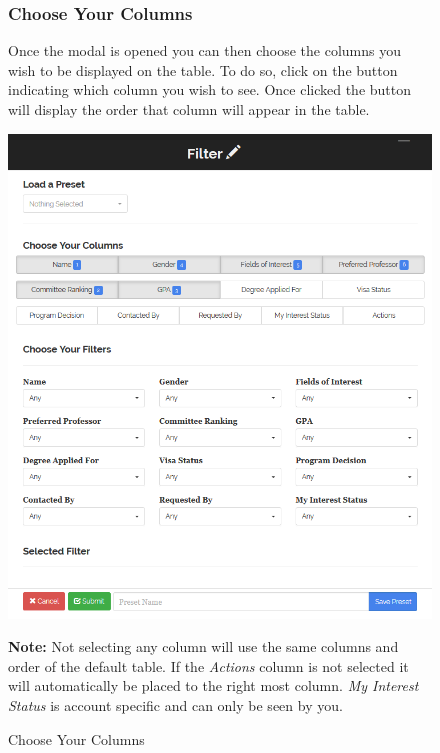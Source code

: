 \documentclass[fontsize=12pt,paper=letter,twoside]{scrartcl}
\begin{document}
\clearpage
\begin{figure}[!htb]
\subsubsection{Choose Your Columns}
Once the modal is opened you can then choose the columns you wish to be displayed on the table. To do so, click on the button indicating which column you wish to see. Once clicked the button will display the order that column will appear in the table.\begin{center}
\includegraphics[width=.99\textwidth]{images/choose_columns.png}
\end{center}
\caption{Choose Your Columns}
\label{fig:choose_columns}
\textbf{Note:} Not selecting any column will use the same columns and order of the default table. If the \emph{Actions} column is not selected it will automatically be placed to the right most column. \emph{My Interest Status} is account specific and can only be seen by you.
\end{figure}

\clearpage
\end{document}
